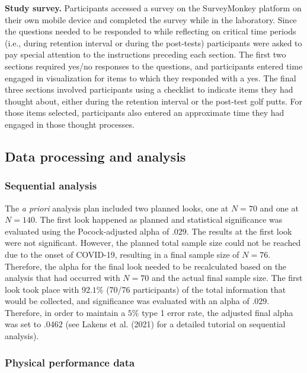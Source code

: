 \documentclass[
  english,
  man,floatsintext]{apa7}
\begin{document}
\textbf{Study survey.} Participants accessed a survey on the SurveyMonkey platform on their own mobile device and completed the survey while in the laboratory. Since the questions needed to be responded to while reflecting on critical time periods (i.e., during retention interval or during the post-tests) participants were asked to pay special attention to the instructions preceding each section. The first two sections required yes/no responses to the questions, and participants entered time engaged in visualization for items to which they responded with a yes. The final three sections involved participants using a checklist to indicate items they had thought about, either during the retention interval or the post-test golf putts. For those items selected, participants also entered an approximate time they had engaged in those thought processes.

\hypertarget{data-processing-and-analysis}{%
\subsection{Data processing and analysis}\label{data-processing-and-analysis}}

\hypertarget{sequential-analysis}{%
\subsubsection{Sequential analysis}\label{sequential-analysis}}

The \emph{a priori} analysis plan included two planned looks, one at \(N = 70\) and one at \(N =140\). The first look happened as planned and statistical significance was evaluated using the Pocock-adjusted alpha of \(.029\). The results at the first look were not significant. However, the planned total sample size could not be reached due to the onset of COVID-19, resulting in a final sample size of \(N = 76\). Therefore, the alpha for the final look needed to be recalculated based on the analysis that had occurred with \(N = 70\) and the actual final sample size. The first look took place with \(92.1\%\) (70/76 participants) of the total information that would be collected, and significance was evaluated with an alpha of \(.029\). Therefore, in order to maintain a \(5\%\) type 1 error rate, the adjusted final alpha was set to \(.0462\) (see Lakens et al. (2021) for a detailed tutorial on sequential analysis).

\hypertarget{physical-performance-data}{%
\subsubsection{Physical performance data}\label{physical-performance-data}}
\end{document}
